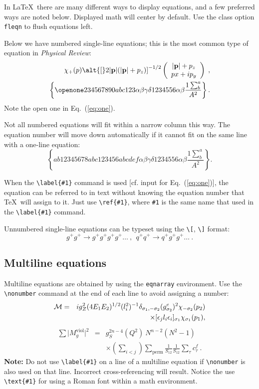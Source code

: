 \documentclass[%
 preprint, linenumbers,
 amsmath,amssymb,
 aps, physrev,
pra,
]{revtex4-2}
\begin{document}
In \LaTeX\ there are many different ways to display equations, and a
few preferred ways are noted below. Displayed math will center by
default. Use the class option \verb+fleqn+ to flush equations left.

Below we have numbered single-line equations; this is the most common
type of equation in \textit{Physical Review}:
\begin{eqnarray}
\chi_+(p)\alt{\bf [}2|{\bf p}|(|{\bf p}|+p_z){\bf ]}^{-1/2}
\left(
\begin{array}{c}
|{\bf p}|+p_z\\
px+ip_y
\end{array}\right)\;,
\\
\left\{%
 \openone234567890abc123\alpha\beta\gamma\delta1234556\alpha\beta
 \frac{1\sum^{a}_{b}}{A^2}%
\right\}%
\label{eq:one}.
\end{eqnarray}
Note the open one in Eq.~(\ref{eq:one}).

Not all numbered equations will fit within a narrow column this
way. The equation number will move down automatically if it cannot fit
on the same line with a one-line equation:
\begin{equation}
\left\{
 ab12345678abc123456abcdef\alpha\beta\gamma\delta1234556\alpha\beta
 \frac{1\sum^{a}_{b}}{A^2}%
\right\}.
\end{equation}

When the \verb+\label{#1}+ command is used [cf. input for
Eq.~(\ref{eq:one})], the equation can be referred to in text without
knowing the equation number that \TeX\ will assign to it. Just
use \verb+\ref{#1}+, where \verb+#1+ is the same name that used in
the \verb+\label{#1}+ command.

Unnumbered single-line equations can be typeset
using the \verb+\[+, \verb+\]+ format:
\[g^+g^+ \rightarrow g^+g^+g^+g^+ \dots ~,~~q^+q^+\rightarrow
q^+g^+g^+ \dots ~. \]


\subsection{Multiline equations}

Multiline equations are obtained by using the \verb+eqnarray+
environment.  Use the \verb+\nonumber+ command at the end of each line
to avoid assigning a number:
\begin{eqnarray}
{\cal M}=&&ig_Z^2(4E_1E_2)^{1/2}(l_i^2)^{-1}
\delta_{\sigma_1,-\sigma_2}
(g_{\sigma_2}^e)^2\chi_{-\sigma_2}(p_2)\nonumber\\
&&\times
[\epsilon_jl_i\epsilon_i]_{\sigma_1}\chi_{\sigma_1}(p_1),
\end{eqnarray}
\begin{eqnarray}
\sum \vert M^{\text{viol}}_g \vert ^2&=&g^{2n-4}_S(Q^2)~N^{n-2}
        (N^2-1)\nonumber \\
 & &\times \left( \sum_{i<j}\right)
  \sum_{\text{perm}}
 \frac{1}{S_{12}}
 \frac{1}{S_{12}}
 \sum_\tau c^f_\tau~.
\end{eqnarray}
\textbf{Note:} Do not use \verb+\label{#1}+ on a line of a multiline
equation if \verb+\nonumber+ is also used on that line. Incorrect
cross-referencing will result. Notice the use \verb+\text{#1}+ for
using a Roman font within a math environment.
\end{document}
